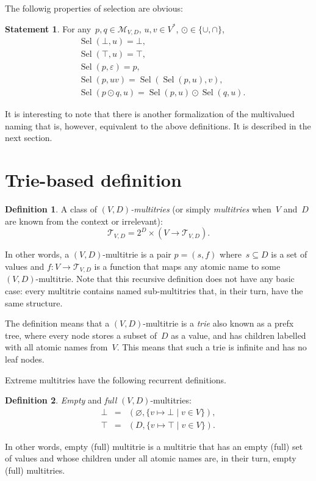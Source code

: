 \documentclass{article}
\theoremstyle{definition}
\newtheorem{Df}{Definition}
\newtheorem{St}{Statement}
\newcommand{\setcharmvcn}{M}
\newcommand{\setcharmt}{T}
\newcommand{\setsymbol}[3]{\mathcal{#1}_{#2,#3}}
\newcommand{\setmvcn}[2]{\setsymbol{\setcharmvcn}{#1}{#2}}
\newcommand{\setmt}[2]{\setsymbol{\setcharmt}{#1}{#2}}
\newcommand{\select}{\operatorname{Sel}}
\begin{document}
The followig properties of selection are obvious:
\begin{St}\label{st:mvcn-selection-properties}
For any~$p,q\in\setmvcn{V}{D}$, $u, v\in V^\ast$, $\odot\in\{\cup, \cap\}$,
\begin{eqnarray*}
  & \select(\bot,u) = \bot, \\
  & \select(\top,u) = \top, \\
  & \select(p,\varepsilon) = p, \\
  & \select(p,uv) = \select(\select(p,u), v), \\
  & \select(p\odot q, u) = \select(p,u)\odot \select(q,u).
\end{eqnarray*}
\end{St}

It is interesting to note that there is another formalization of the
multivalued naming that is, however, equivalent to the above definitions.  It
is described in the next section.


\section{Trie-based definition}

\begin{Df}\label{df:mt}
A class of \emph{$(V,D)$-multitries} (or simply \emph{multitries} when~$V$
and~$D$ are known from the context or irrelevant):
\[
  \setmt{V}{D} = 2^D \times (V \to \setmt{V}{D}) .
\]
\end{Df}

In other words, a $(V,D)$-multitrie is a pair $p = (s, f)$ where~$s\subseteq D$
is a set of values and $f: V \to \setmt{V}{D}$ is a function that maps any
atomic name to some $(V,D)$-multitrie. Note that this recursive definition does
not have any basic case: every multitrie contains named sub-multitries that, in
their turn, have the same structure.

The definition means that a $(V,D)$-multitrie is a \emph{trie} also known as
a prefx tree, where every node stores a subset of~$D$ as a value, and has
children labelled with all atomic names from~$V$. This means that such a trie
is infinite and has no leaf nodes.

Extreme multitries have the following recurrent definitions.
\begin{Df}\label{df:mt-extreme}
\emph{Empty} and \emph{full} $(V,D)$-multitries:
\begin{eqnarray*}
  \bot & = & ( \varnothing, \{ v \mapsto \bot \mid v\in V \} ) , \\
  \top & = & ( D,           \{ v \mapsto \top \mid v\in V \} ) .
\end{eqnarray*}
\end{Df}
In other words, empty (full) multitrie is a multitrie that has an empty
(full) set of values and whose children under all atomic names are, in their
turn, empty (full) multitries.
\end{document}
